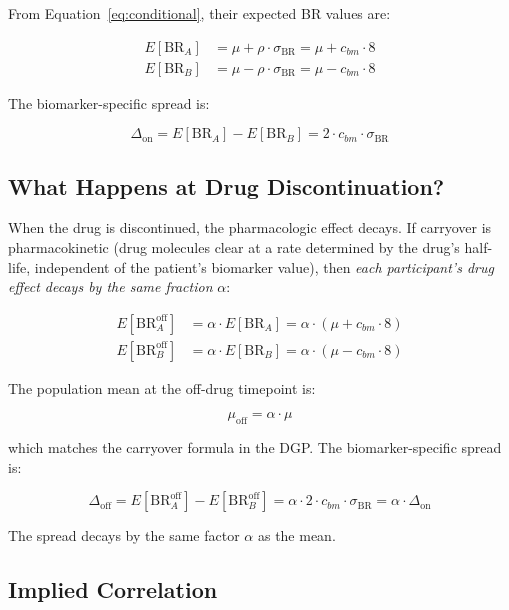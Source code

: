 \documentclass[11pt]{article}
\begin{document}
From Equation~\ref{eq:conditional}, their expected BR values
are:

\begin{align}
E[\text{BR}_A] &= \mu + \rho \cdot \sigma_{\text{BR}} = \mu + c_{bm} \cdot 8 \label{eq:brA} \\
E[\text{BR}_B] &= \mu - \rho \cdot \sigma_{\text{BR}} = \mu - c_{bm} \cdot 8 \label{eq:brB}
\end{align}

The biomarker-specific spread is:

\begin{equation}
\Delta_{\text{on}} = E[\text{BR}_A] - E[\text{BR}_B]
= 2 \cdot c_{bm} \cdot \sigma_{\text{BR}}
\label{eq:spread_on}
\end{equation}

\subsection{What Happens at Drug Discontinuation?}

When the drug is discontinued, the pharmacologic effect decays.
If carryover is pharmacokinetic (drug molecules clear at a
rate determined by the drug's half-life, independent of the
patient's biomarker value), then \emph{each participant's
drug effect decays by the same fraction} $\alpha$:

\begin{align}
E[\text{BR}_A^{\text{off}}] &= \alpha \cdot E[\text{BR}_A]
  = \alpha \cdot (\mu + c_{bm} \cdot 8) \\
E[\text{BR}_B^{\text{off}}] &= \alpha \cdot E[\text{BR}_B]
  = \alpha \cdot (\mu - c_{bm} \cdot 8)
\end{align}

The population mean at the off-drug timepoint is:

\[
\mu_{\text{off}} = \alpha \cdot \mu
\]

which matches the carryover formula in the DGP. The
biomarker-specific spread is:

\begin{equation}
\Delta_{\text{off}} = E[\text{BR}_A^{\text{off}}] -
  E[\text{BR}_B^{\text{off}}]
= \alpha \cdot 2 \cdot c_{bm} \cdot \sigma_{\text{BR}}
= \alpha \cdot \Delta_{\text{on}}
\label{eq:spread_off}
\end{equation}

The spread decays by the same factor $\alpha$ as the mean.

\subsection{Implied Correlation}
\end{document}

